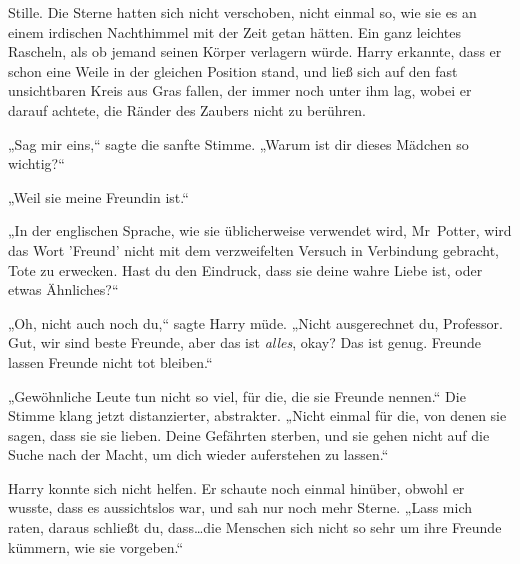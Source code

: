 Stille. Die Sterne hatten sich nicht verschoben, nicht einmal so, wie sie es an einem irdischen Nachthimmel mit der Zeit getan hätten. Ein ganz leichtes Rascheln, als ob jemand seinen Körper verlagern würde. Harry erkannte, dass er schon eine Weile in der gleichen Position stand, und ließ sich auf den fast unsichtbaren Kreis aus Gras fallen, der immer noch unter ihm lag, wobei er darauf achtete, die Ränder des Zaubers nicht zu berühren.

„Sag mir eins,“ sagte die sanfte Stimme. „Warum ist dir dieses Mädchen so wichtig?“

„Weil sie meine Freundin ist.“

„In der englischen Sprache, wie sie üblicherweise verwendet wird, Mr~Potter, wird das Wort 'Freund' nicht mit dem verzweifelten Versuch in Verbindung gebracht, Tote zu erwecken. Hast du den Eindruck, dass sie deine wahre Liebe ist, oder etwas Ähnliches?“

„Oh, nicht auch noch du,“ sagte Harry müde. „Nicht ausgerechnet du, Professor. Gut, wir sind beste Freunde, aber das ist \emph{alles}, okay? Das ist genug. Freunde lassen Freunde nicht tot bleiben.“

„Gewöhnliche Leute tun nicht so viel, für die, die sie Freunde nennen.“ Die Stimme klang jetzt distanzierter, abstrakter. „Nicht einmal für die, von denen sie sagen, dass sie sie lieben. Deine Gefährten sterben, und sie gehen nicht auf die Suche nach der Macht, um dich wieder auferstehen zu lassen.“

Harry konnte sich nicht helfen. Er schaute noch einmal hinüber, obwohl er wusste, dass es aussichtslos war, und sah nur noch mehr Sterne.
„Lass mich raten, daraus schließt du, dass…die Menschen sich nicht so sehr um ihre Freunde kümmern, wie sie vorgeben.“

